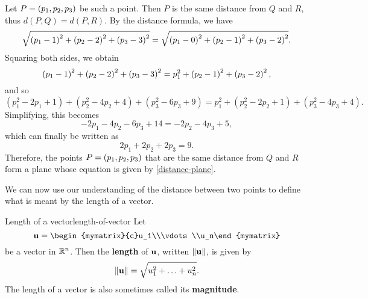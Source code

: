 \begin{solution}
  Let $P = \left(p_1,p_2,p_3\right)$ be such a point. Then $P$ is the same
  distance from $Q$ and $R$, thus $d(P,Q)=d(P,R)$. By the distance
  formula, we have
  \begin{equation*}
    \sqrt{\left(p_1-1\right)^{2}+\left(p_2-2\right)^{2}+\left(p_3-3\right)^{2}}=
    \sqrt{\left(p_1-0\right)^{2}+\left(p_2-1\right)^{2}+\left(p_3-2\right)^{2}}.
  \end{equation*}
  Squaring both sides, we obtain 
  \begin{equation*}
    \left(p_1 -1\right) ^{2}+\left(p_2 -2\right) ^{2}+\left(p_3 -3\right)
    ^{2}=p_1^{2}+\left(p_2-1\right) ^{2}+\left(p_3 -2\right) ^{2},
  \end{equation*}
  and so
  \begin{equation*}
    \allowbreak (p_1^{2}-2p_1+1)+(p_2^{2}-4p_2+4)+(p_3^{2}-6p_3+9)=p_1^{2}+(p_2^{2}-2p_2+1)+(p_3^{2}-4p_3+4).
  \end{equation*}
  Simplifying, this becomes
  \begin{equation*}
    -2p_1-4p_2-6p_3+14=-2p_2-4p_3+5,
  \end{equation*}
  which can finally be written as 
  \begin{equation}\label{distance-plane}
    2p_1+2p_2+2p_3=9.
  \end{equation}
  Therefore, the points $P = \left(p_1,p_2,p_3\right)$ that are the same
  distance from $Q$ and $R$ form a plane whose equation is given by
  \eqref{distance-plane}.
\end{solution}

We can now use our understanding of the distance between two points to
define what is meant by the length of a vector.

\begin{definition}{Length of a vector}{length-of-vector}
  Let
  \[
    \vect{u} = \begin{mymatrix}{c}u_1\\\vdots\\u_n\end{mymatrix}
  \]
  be a vector in $\mathbb{R}^n$. Then the
  \textbf{length} of
  $\mbox{\bf u}$, written $\left\|\mbox{\bf u}\right\|$, is given by
  \begin{equation*}
    \left\|\mbox{\bf u}\right\| = \sqrt{u_{1}^2 + \ldots + u_{n}^2}.
  \end{equation*}
  The length of a vector is also sometimes called its
  \textbf{magnitude}.
\end{definition}

